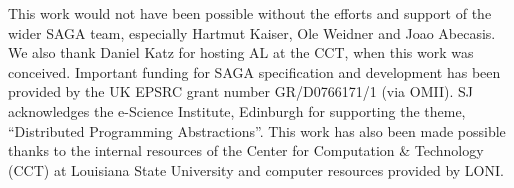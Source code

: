 \documentclass[times, 10pt, twocolumn]{article}
\begin{document}
This work would not have been possible without the efforts and support
of the wider SAGA team, especially Hartmut Kaiser, Ole Weidner and
Joao Abecasis. We also thank Daniel Katz for hosting AL at the CCT,
when this work was conceived.  Important funding for SAGA
specification and development has been provided by the UK EPSRC grant
number GR/D0766171/1 (via OMII).  SJ acknowledges the e-Science
Institute, Edinburgh for supporting the theme, ``Distributed
Programming Abstractions''.  This work has also been made possible
thanks to the internal resources of the Center for Computation \&
Technology (CCT) at Louisiana State University and computer resources
provided by LONI.  


% 

\end{document}

